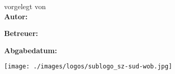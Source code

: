 \begin{titlepage}

    \vfil

    \hspace{1cm}
    \begin{minipage}{\dimexpr\textwidth-1.5cm\relax}
        {\Large\textsf{
                {vorgelegt von \\\textbf{\documentAuthor}}
                {\textbf{Autor:} \\\documentAuthor}
            }
        }

        \vspace{0.5cm}

        {\Large\textsf{
            \textbf{Betreuer:}
        }}

        \vspace{0.5cm}

        {\Large\textsf{
            \textbf{Abgabedatum:} \\\documentDate
        }}
    \end{minipage}

    \vfil


    \enlargethispage{5\baselineskip}

    \texttt{[image: ./images/logos/sublogo\_sz-sud-wob.jpg]}


\end{titlepage}

\restoregeometry